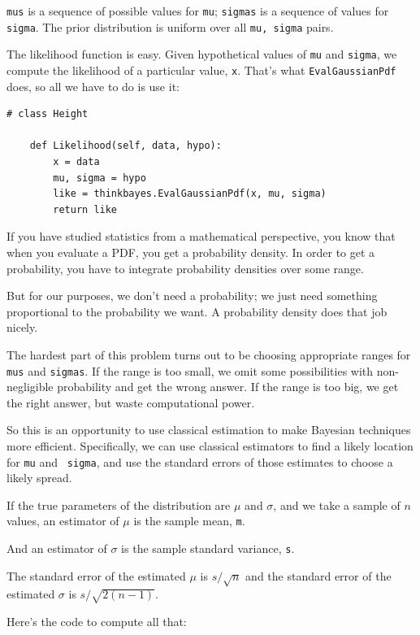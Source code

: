 \documentclass[12pt]{book}
\begin{document}
{\tt mus} is a sequence of possible values for {\tt mu}; {\tt sigmas}
is a sequence of values for {\tt sigma}.  The prior distribution
is uniform over all {\tt mu, sigma} pairs.

The likelihood function is easy.  Given hypothetical values
of {\tt mu} and {\tt sigma}, we compute the likelihood
of a particular value, {\tt x}.  That's what {\tt EvalGaussianPdf}
does, so all we have to do is use it:

\begin{verbatim}
# class Height

    def Likelihood(self, data, hypo):
        x = data
        mu, sigma = hypo
        like = thinkbayes.EvalGaussianPdf(x, mu, sigma)
        return like
\end{verbatim}

If you have studied statistics from a mathematical perspective,
you know that when you evaluate a PDF, you get a probability
density.  In order to get a probability, you have to integrate
probability densities over some range.

But for our purposes, we don't need a probability; we just
need something proportional to the probability we want.
A probability density does that job nicely.

The hardest part of this problem turns
out to be choosing appropriate ranges for {\tt mus} and
{\tt sigmas}.  If the range is too small, we omit some
possibilities with non-negligible probability and get the
wrong answer.  If the range is too big, we get the right answer,
but waste computational power.

So this is an opportunity to use classical estimation to
make Bayesian techniques more efficient.  Specifically, we can use
classical estimators to find a likely location for {\tt mu} and {\tt
  sigma}, and use the standard errors of those estimates to choose a
likely spread.

If the true parameters of the distribution are $\mu$ and
$\sigma$, and we take a sample of $n$ values, an estimator
of $\mu$ is the sample mean, {\tt m}.

And an estimator of $\sigma$ is the sample standard
variance, {\tt s}.

The standard error of the estimated $\mu$ is $s / \sqrt{n}$
and the standard error of the estimated $\sigma$ is
$s / \sqrt{2 (n-1)}$.

Here's the code to compute all that:
\end{document}
